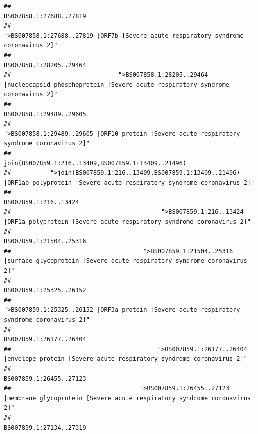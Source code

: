 \documentclass[
]{article}
\begin{document}
\begin{verbatim}
##                                                                                                                BS007858.1:27688..27819 
##                                                    ">BS007858.1:27688..27819 |ORF7b [Severe acute respiratory syndrome coronavirus 2]" 
##                                                                                                                BS007858.1:28205..29464 
##                              ">BS007858.1:28205..29464 |nucleocapsid phosphoprotein [Severe acute respiratory syndrome coronavirus 2]" 
##                                                                                                                BS007858.1:29489..29605 
##                                            ">BS007858.1:29489..29605 |ORF10 protein [Severe acute respiratory syndrome coronavirus 2]" 
##                                                                                    join(BS007859.1:216..13409,BS007859.1:13409..21496) 
##           ">join(BS007859.1:216..13409,BS007859.1:13409..21496) |ORF1ab polyprotein [Severe acute respiratory syndrome coronavirus 2]" 
##                                                                                                                  BS007859.1:216..13424 
##                                          ">BS007859.1:216..13424 |ORF1a polyprotein [Severe acute respiratory syndrome coronavirus 2]" 
##                                                                                                                BS007859.1:21504..25316 
##                                     ">BS007859.1:21504..25316 |surface glycoprotein [Severe acute respiratory syndrome coronavirus 2]" 
##                                                                                                                BS007859.1:25325..26152 
##                                            ">BS007859.1:25325..26152 |ORF3a protein [Severe acute respiratory syndrome coronavirus 2]" 
##                                                                                                                BS007859.1:26177..26404 
##                                         ">BS007859.1:26177..26404 |envelope protein [Severe acute respiratory syndrome coronavirus 2]" 
##                                                                                                                BS007859.1:26455..27123 
##                                    ">BS007859.1:26455..27123 |membrane glycoprotein [Severe acute respiratory syndrome coronavirus 2]" 
##                                                                                                                BS007859.1:27134..27319 

\end{verbatim}
\end{document}
